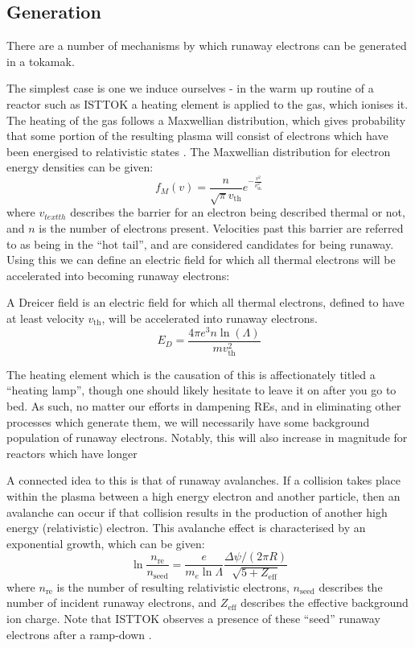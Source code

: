 \subsection{Generation}

There are a number of mechanisms by which runaway electrons can be generated in a tokamak.

The simplest case is one we induce ourselves - in the warm up routine of a reactor such as ISTTOK a heating element 
is applied to the gas, which ionises it. The heating of the gas follows a Maxwellian distribution, which 
gives probability that some portion of the resulting plasma will consist of electrons which have been 
energised to relativistic states \cite{runaway-electrons}. The Maxwellian distribution for electron energy densities 
can be given:
$$f_{M}(v) = \frac{n}{\sqrt{\pi} v_{\text{th}}} e^{-\frac{v^2}{v_{\text{th}}^2}}$$
where $v_{text{th}}$ describes the barrier for an electron being described thermal or not, and $n$ is the number 
of electrons present. Velocities past this barrier are referred to as being in the ``hot tail'', and are considered 
candidates for being runaway. Using this we can define an electric field for which all thermal electrons will be 
accelerated into becoming runaway electrons:
\begin{definition}
    A Dreicer field is an electric field for which all thermal electrons, defined to have at least velocity $v_{\text{th}}$,
    will be accelerated into runaway electrons.
    \begin{equation*}
        E_{D} = \frac{4\pi e^3 n \ln (\Lambda)}{m v_{\text{th}}^2}
    \end{equation*}
\end{definition}
The heating element which is the causation of this is affectionately titled a ``heating lamp'', 
though one should likely hesitate to leave it on after you go to bed. As such, no matter our efforts in dampening 
REs, and in eliminating other processes which generate them, we will necessarily have some background population 
of runaway electrons. Notably, this will also increase in magnitude for reactors which have longer 

A connected idea to this is that of runaway avalanches. If a collision takes place within the plasma between a high 
energy electron and another particle, then an avalanche can occur if that collision results in the production of another 
high energy (relativistic) electron. This avalanche effect is characterised by an exponential growth, which can be given:
\begin{equation*}
    \ln \frac{n_{\text{re}}}{n_{\text{seed}}} = \frac{e}{m_e \ln \Lambda} \frac{\Delta \psi / (2\pi R)}{\sqrt{5 + Z_{\text{eff}}}}
\end{equation*}
where $n_{\text{re}}$ is the number of resulting relativistic electrons, $n_{\text{seed}}$ describes the 
number of incident runaway electrons, and $Z_{\text{eff}}$ describes the effective background ion charge. Note that ISTTOK observes a 
presence of these ``seed'' runaway electrons after a ramp-down \cite{malaquias-matthew}.

